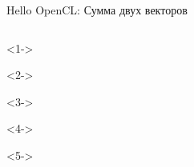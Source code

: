 \documentclass[@BEAMER_OPTIONS@]{beamer}
\begin{document}
\begin{frame}[fragile]{Hello OpenCL: Сумма двух векторов}
    \vspace{-1\baselineskip}
    \begin{columns}
        \begin{column}{0.2\textwidth}
            \begin{minipage}[c][\textheight][c]{\linewidth}
                \begin{exampleblock}{}
                    \begin{adjustbox}{width=0.19\textwidth, height=\textheight, keepaspectratio}
                        \begin{minipage}{\textwidth}
                            \begin{uncoverenv}<1->
                                
                            \end{uncoverenv}
                            \begin{uncoverenv}<2->
                                
                            \end{uncoverenv}
                            \begin{uncoverenv}<3->
                                
                            \end{uncoverenv}
                            \begin{uncoverenv}<4->
                                
                            \end{uncoverenv}
                            \begin{uncoverenv}<5->
                                
                            \end{uncoverenv}
                        \end{minipage}
                    \end{adjustbox}
                \end{exampleblock}
            \end{minipage}
        \end{column}
        \begin{column}{0.7\textwidth}

\end{column}
\end{columns}
\end{frame}
\end{document}
